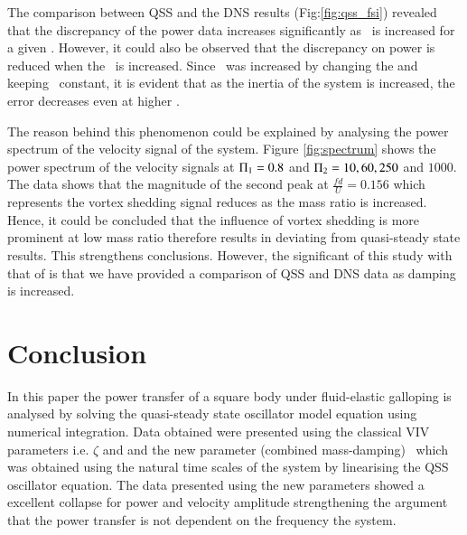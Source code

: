 The comparison between QSS and the DNS results (Fig:\ref{fig:qss_fsi}) revealed that
the discrepancy of the power data  increases significantly as \massdamp \ is increased for a given \massstiff. However, it could also be observed that the discrepancy on power is reduced when the \massstiff \ is increased. Since \massstiff \ was increased by changing the \mstar and keeping \ustar \ constant, it is evident that as the inertia of the system is increased, the error decreases even at higher \massdamp.

\begin{center}
	
\end{center}
%

The reason behind this phenomenon could be explained by analysing the power spectrum of the velocity signal of the system. Figure \ref{fig:spectrum} shows the power spectrum of the velocity signals at $\Pi_1=0.8$ and $\Pi_2= 10, 60, 250$ and $1000$. The data shows that the  magnitude of the second peak at $\frac{fd}{U}=0.156$ which represents the vortex shedding signal reduces as the mass ratio is increased. Hence, it could be concluded that the influence of vortex shedding is more prominent at low mass ratio therefore results in deviating from quasi-steady state results. This strengthens \cite{Joly2012} conclusions. However, the significant of this study with that of \cite{Joly2012} is that we have provided a comparison of QSS and DNS data as damping is increased. 






 
 
 
 
 
 \section{Conclusion}
  \label{sec:conc}
  In this paper the power transfer of a square body under fluid-elastic galloping is analysed by solving the quasi-steady state oscillator model equation using numerical  integration. Data obtained were presented using the classical VIV parameters i.e. $\zeta$ and \ustar and the new parameter (combined mass-damping) \massdamp \ which was obtained using the natural time scales of the system by linearising the QSS oscillator equation. The data presented using the new parameters showed a excellent collapse for power and velocity amplitude strengthening the argument that the power transfer is not dependent on the frequency the system.   
 
 
 
 
 
 
 
 
 
 
 
 
 
 
 
 
 
 
 
 
 
 
 
 
 
 







